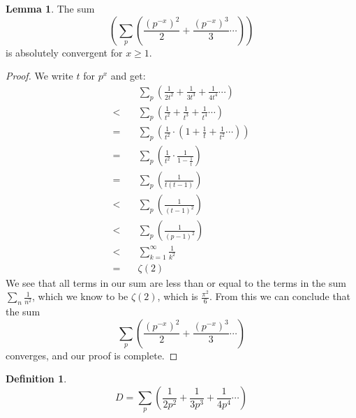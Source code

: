 \documentclass{article}
\theoremstyle{definition}
\newtheorem{definition}{Definition}[section]
\newtheorem{lemma}[theorem]{Lemma}
\theoremstyle{remark}
\begin{document}
\begin{lemma}\label{Sum leq zeta}
The sum
$$\left(\sum_p\left(\frac{(p^{-x})^2}{2}+\frac{(p^{-x})^3}{3}\cdots \right)\right)$$
is absolutely convergent for $x\geq 1$.
\end{lemma}
\begin{proof}
We write $t$ for $p^x$ and get:
\begin{equation}
\begin{split}
& \sum_p\left(\frac{1}{2t^2}+\frac{1}{3t^3}+\frac{1}{4t^4}\cdots \right) \\
< \quad & \sum_p \left(\frac{1}{t^2}+\frac{1}{t^3}+\frac{1}{t^4} \cdots \right) \\
= \quad & \sum_p \left(\frac{1}{t^2}\cdot (1+\frac{1}{t}+\frac{1}{t^2}\cdots) \right)  \\
= \quad & \sum_p \left(\frac{1}{t^2}\cdot \frac{1}{1-\frac{1}{t}} \right) \\
= \quad & \sum_p \left(\frac{1}{t(t-1)} \right) \\
< \quad & \sum_p \left(\frac{1}{(t-1)^2} \right) \\
< \quad & \sum_p \left(\frac{1}{(p-1)^2} \right) \\
< \quad & \sum_{k=1}^{\infty}\frac{1}{k^2} \\
= \quad & \zeta(2)
\end{split}
\end{equation}
We see that all terms in our sum are less than or equal to the terms in the sum $\sum_n\frac{1}{n^2}$, which we know to be $\zeta(2)$, which is $\frac{\pi^2}{6}$. From this we can conclude that the sum
$$\sum_p\left(\frac{(p^{-x})^2}{2}+\frac{(p^{-x})^3}{3}\cdots \right)$$
converges, and our proof is complete.
\end{proof}

\begin{definition} \label{def1.1}
$$D=\sum_p\left(\frac{1}{2p^2}+\frac{1}{3p^3}+\frac{1}{4p^4}\cdots \right)$$
\end{definition}
\end{document}
